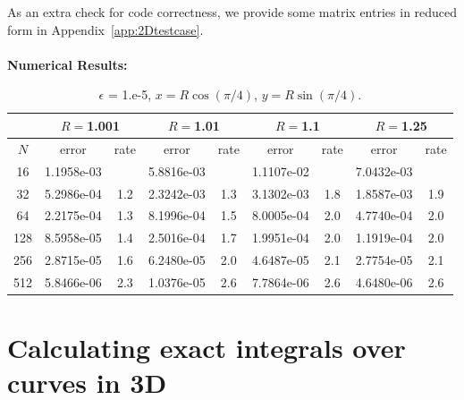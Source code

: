 \documentclass[12pt]{article}
\newcommand{\eps}{\epsilon}
\begin{document}
	As an extra check for code correctness, we provide some matrix entries in reduced form in Appendix~\ref{app:2Dtestcase}.\\ \vspace{0.5mm} \\
	\textbf{Numerical Results:} \\
	\begin{table}[!h]
		\centering
	\begin{tabular}{|c|c|c|c|c|c|c|c|c|}
		\hline
		 & \multicolumn{2}{|c|}{$R=$1.001} & \multicolumn{2}{|c|}{$R=$1.01} & \multicolumn{2}{|c|}{$R=$1.1} & \multicolumn{2}{|c|}{$R=$1.25} \\
		\hline
		$N$ & error & rate & error & rate & error & rate & error & rate \\
		\hline
		  16   &   1.1958e-03 &    &  5.8816e-03  &     & 1.1107e-02  &   &  7.0432e-03 & 	     \\
		  32   &   5.2986e-04 &  1.2 &  2.3242e-03  & 1.3  & 3.1302e-03  & 1.8 &  1.8587e-03 & 	1.9     \\
		  64   &   2.2175e-04 &  1.3 &  8.1996e-04  & 1.5  & 8.0005e-04  & 2.0 &  4.7740e-04 & 	2.0     \\
		 128   &   8.5958e-05 &  1.4 &  2.5016e-04  & 1.7  & 1.9951e-04  & 2.0 &  1.1919e-04 & 	2.0     \\
		 256   &   2.8715e-05 &  1.6 &  6.2480e-05  & 2.0  & 4.6487e-05  & 2.1 &  2.7754e-05 & 	2.1     \\
		 512   &   5.8466e-06 &  2.3 &  1.0376e-05  & 2.6  & 7.7864e-06  & 2.6 &  4.6480e-06 & 	2.6     \\
		\hline
	\end{tabular}
	\caption{$\eps$ = 1.e-5, $x = R\cos(\pi/4)$, $y=R\sin(\pi/4)$.}
\end{table}

	
\section{Calculating exact integrals over curves in 3D}
\end{document}
